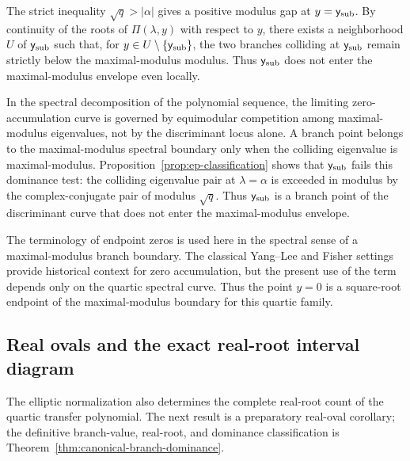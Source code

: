 \begin{remark}\label{rem:ysub-local-gap}
The strict inequality $\sqrt{q}>|\alpha|$ gives a positive modulus gap at \(y=\mathsf{y}_{\mathrm{sub}}\).
By continuity of the roots of \(\Pi(\lambda,y)\) with respect to \(y\), there exists a neighborhood \(U\) of \(\mathsf{y}_{\mathrm{sub}}\) such that, for \(y\in U\setminus\{\mathsf{y}_{\mathrm{sub}}\}\), the two branches colliding at \(\mathsf{y}_{\mathrm{sub}}\) remain strictly below the maximal-modulus modulus.
Thus \(\mathsf{y}_{\mathrm{sub}}\) does not enter the maximal-modulus envelope even locally.
\end{remark}

\begin{remark}\label{rem:maximal-modulus-endpoint}
In the spectral decomposition of the polynomial sequence, the limiting zero-accumulation curve is governed by equimodular competition among maximal-modulus eigenvalues, not by the discriminant locus alone.
A branch point belongs to the maximal-modulus spectral boundary only when the colliding eigenvalue is maximal-modulus.
Proposition~\ref{prop:ep-classification} shows that $\mathsf{y}_{\mathrm{sub}}$ fails this dominance test: the colliding eigenvalue pair at $\lambda = \alpha$ is exceeded in modulus by the complex-conjugate pair of modulus $\sqrt{q}$.
Thus $\mathsf{y}_{\mathrm{sub}}$ is a branch point of the discriminant curve that does not enter the maximal-modulus envelope.
\end{remark}

\begin{remark}\label{rem:yang-lee-distinction}
The terminology of endpoint zeros is used here in the spectral sense of a maximal-modulus branch boundary.
The classical Yang--Lee and Fisher settings \cite{YangLee1952I,LeeYang1952II,Fisher1978,KortmanGriffiths1971} provide historical context for zero accumulation, but the present use of the term depends only on the quartic spectral curve.
Thus the point $y=0$ is a square-root endpoint of the maximal-modulus boundary for this quartic family.
\end{remark}

\subsection{Real ovals and the exact real-root interval diagram}

The elliptic normalization also determines the complete real-root count of the quartic transfer polynomial.
The next result is a preparatory real-oval corollary; the definitive branch-value, real-root, and dominance classification is Theorem~\ref{thm:canonical-branch-dominance}.

